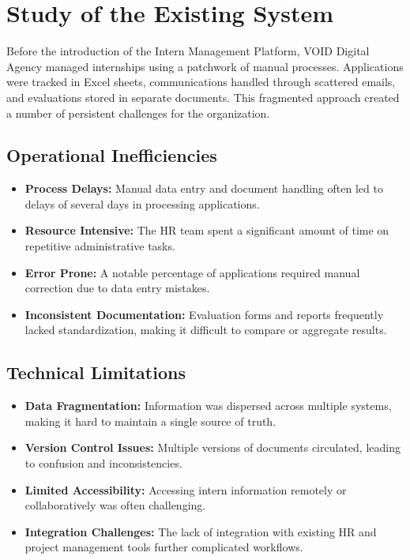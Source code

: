 \section{Study of the Existing System}
\noindent
Before the introduction of the Intern Management Platform, VOID Digital Agency \cite{void2025clients} managed internships using a patchwork of manual processes. Applications were tracked in Excel sheets, communications handled through scattered emails, and evaluations stored in separate documents. This fragmented approach created a number of persistent challenges for the organization.

\subsection{Operational Inefficiencies}
\begin{itemize}
    \item \textbf{Process Delays:} Manual data entry and document handling often led to delays of several days in processing applications.
    \item \textbf{Resource Intensive:} The HR team spent a significant amount of time on repetitive administrative tasks.
    \item \textbf{Error Prone:} A notable percentage of applications required manual correction due to data entry mistakes.
    \item \textbf{Inconsistent Documentation:} Evaluation forms and reports frequently lacked standardization, making it difficult to compare or aggregate results.
\end{itemize}

\subsection{Technical Limitations}
\begin{itemize}
    \item \textbf{Data Fragmentation:} Information was dispersed across multiple systems, making it hard to maintain a single source of truth.
    \item \textbf{Version Control Issues:} Multiple versions of documents circulated, leading to confusion and inconsistencies.
    \item \textbf{Limited Accessibility:} Accessing intern information remotely or collaboratively was often challenging.
    \item \textbf{Integration Challenges:} The lack of integration with existing HR and project management tools further complicated workflows.
\end{itemize}

